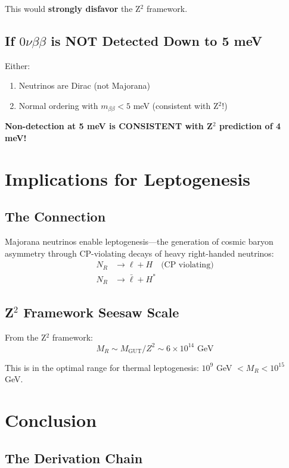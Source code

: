 \documentclass[12pt,a4paper]{article}
\begin{document}
This would \textbf{strongly disfavor} the Z$^2$ framework.

\subsection{If $0\nu\beta\beta$ is NOT Detected Down to 5 meV}

Either:
\begin{enumerate}
\item[(a)] Neutrinos are Dirac (not Majorana)
\item[(b)] Normal ordering with $m_{\beta\beta} < 5$ meV (consistent with Z$^2$!)
\end{enumerate}

\textbf{Non-detection at 5 meV is CONSISTENT with Z$^2$ prediction of 4 meV!}

\section{Implications for Leptogenesis}

\subsection{The Connection}

Majorana neutrinos enable leptogenesis---the generation of cosmic baryon asymmetry through CP-violating decays of heavy right-handed neutrinos:
\begin{align}
N_R &\rightarrow \ell + H \quad \text{(CP violating)} \\
N_R &\rightarrow \bar{\ell} + H^*
\end{align}

\subsection{Z$^2$ Framework Seesaw Scale}

From the Z$^2$ framework:
\begin{equation}
M_R \sim M_{\text{GUT}} / Z^2 \sim 6 \times 10^{14} \text{ GeV}
\end{equation}

This is in the optimal range for thermal leptogenesis: $10^9$ GeV $< M_R < 10^{15}$ GeV.

\section{Conclusion}

\subsection{The Derivation Chain}
\end{document}
